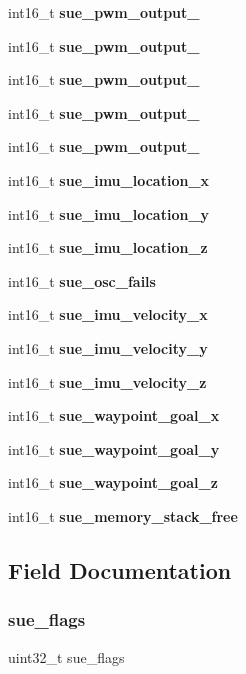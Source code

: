 \begin{DoxyCompactItemize}
int16\+\_\+t \textbf{ sue\+\_\+pwm\+\_\+output\+\_}
\item 
int16\+\_\+t \textbf{ sue\+\_\+pwm\+\_\+output\+\_}
\item 
int16\+\_\+t \textbf{ sue\+\_\+pwm\+\_\+output\+\_}
\item 
int16\+\_\+t \textbf{ sue\+\_\+pwm\+\_\+output\+\_}
\item 
int16\+\_\+t \textbf{ sue\+\_\+pwm\+\_\+output\+\_}
\item 
int16\+\_\+t \textbf{ sue\+\_\+imu\+\_\+location\+\_\+x}
\item 
int16\+\_\+t \textbf{ sue\+\_\+imu\+\_\+location\+\_\+y}
\item 
int16\+\_\+t \textbf{ sue\+\_\+imu\+\_\+location\+\_\+z}
\item 
int16\+\_\+t \textbf{ sue\+\_\+osc\+\_\+fails}
\item 
int16\+\_\+t \textbf{ sue\+\_\+imu\+\_\+velocity\+\_\+x}
\item 
int16\+\_\+t \textbf{ sue\+\_\+imu\+\_\+velocity\+\_\+y}
\item 
int16\+\_\+t \textbf{ sue\+\_\+imu\+\_\+velocity\+\_\+z}
\item 
int16\+\_\+t \textbf{ sue\+\_\+waypoint\+\_\+goal\+\_\+x}
\item 
int16\+\_\+t \textbf{ sue\+\_\+waypoint\+\_\+goal\+\_\+y}
\item 
int16\+\_\+t \textbf{ sue\+\_\+waypoint\+\_\+goal\+\_\+z}
\item 
int16\+\_\+t \textbf{ sue\+\_\+memory\+\_\+stack\+\_\+free}
\end{DoxyCompactItemize}


\subsection{Field Documentation}
\mbox{\label{struct____mavlink__serial__udb__extra__f2__b__t_aed93562df35d1334093f323bd4ccf797}} 
\subsubsection{sue\+\_\+flags}
{\footnotesize\ttfamily uint32\+\_\+t sue\+\_\+flags}

